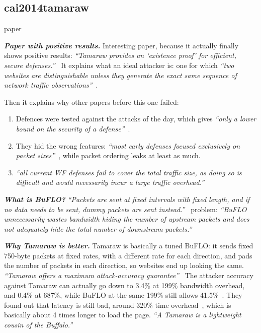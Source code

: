 \subsection{cai2014tamaraw}
paper~\cite{cai2014tamaraw}



\textbf{\textit{Paper with positive results.}}
Interesting paper, because it actually finally shows positive results: \textit{``Tamaraw provides an `existence proof' for efficient, secure defenses.''}~\cite[Abstract]{cai2014tamaraw}
It explains what an ideal attacker is: one for which \textit{``two websites are distinguishable unless they generate the exact same sequence of network traffic observations''}~\cite[\S1]{cai2014tamaraw}.

Then it explains why other papers before this one failed:
\begin{enumerate}
    \item Defences were tested against the attacks of the day, which gives \textit{``only a lower bound on the security of a defense''}~\cite[\S1]{cai2014tamaraw}.
    \item They hid the wrong features: \textit{``most early defenses focused exclusively on packet sizes''}~\cite[\S1]{cai2014tamaraw}, while packet ordering leaks at least as much.
    \item \textit{``all current WF defenses fail to cover the total traffic size, as doing so is difficult and would necessarily incur a large traffic overhead.''}~\cite[\S3.1]{cai2014tamaraw}
\end{enumerate}

\textbf{\textit{What is BuFLO?}}
\textit{``Packets are sent at fixed intervals with fixed length, and if no data needs to be sent, dummy packets are sent instead.''}~\cite[\S4.1]{cai2014tamaraw}
problem: \textit{``BuFLO unnecessarily wastes bandwidth hiding the number of upstream packets and does not adequately hide the total number of downstream packets.''}~\cite[\S1]{cai2014tamaraw}

\textbf{\textit{Why Tamaraw is better.}}
Tamaraw is basically a tuned BuFLO: it sends fixed 750-byte packets at fixed rates, with a different rate for each direction, and pads the number of packets in each direction, so websites end up looking the same. \textit{``Tamaraw offers a maximum attack-accuracy guarantee''}~\cite[\S6.1]{cai2014tamaraw}
The attacker accuracy against Tamaraw can actually go down to 3.4\% at 199\% bandwidth overhead, and 0.4\% at 687\%, while BuFLO at the same 199\% still allows 41.5\%~\cite[Table~1]{cai2014tamaraw}. They found out that latency is still bad, around 320\% time overhead~\cite[\S6.2]{cai2014tamaraw}, which is basically about 4 times longer to load the page.
\textit{``A Tamaraw is a lightweight cousin of the Buffalo.''}~\cite[\S6]{cai2014tamaraw}

